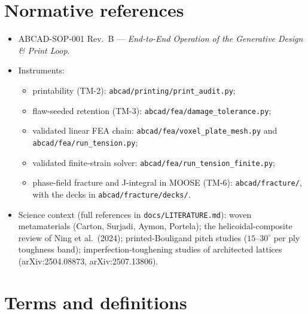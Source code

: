 \documentclass[11pt]{article}
\begin{document}
\section{Normative references}
\begin{itemize}[nosep]
  \item ABCAD-SOP-001 Rev.~B --- \emph{End-to-End Operation of the Generative Design \& Print Loop}.
  \item Instruments:
    \begin{itemize}[nosep]
      \item printability (TM-2): \texttt{abcad/printing/print\_audit.py};
      \item flaw-seeded retention (TM-3): \texttt{abcad/fea/damage\_tolerance.py};
      \item validated linear FEA chain: \texttt{abcad/fea/voxel\_plate\_mesh.py} and \texttt{abcad/fea/run\_tension.py};
      \item validated finite-strain solver: \texttt{abcad/fea/run\_tension\_finite.py};
      \item phase-field fracture and J-integral in MOOSE (TM-6): \texttt{abcad/fracture/}, with the decks in
            \texttt{abcad/fracture/decks/}.
    \end{itemize}
  \item Science context (full references in \texttt{docs/LITERATURE.md}): woven metamaterials (Carton,
        Surjadi, Aymon, Portela); the helicoidal-composite review of Ning et al.\ (2024); printed-Bouligand
        pitch studies ($15$--$30^\circ$ per ply toughness band); imperfection-toughening studies of
        architected lattices (arXiv:2504.08873, arXiv:2507.13806).
\end{itemize}

\section{Terms and definitions}
\end{document}
